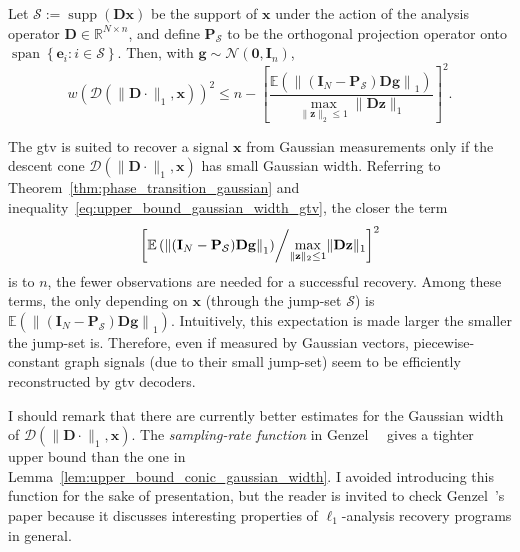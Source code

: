 \begin{lemma}\label{lem:upper_bound_conic_gaussian_width}
    Let $\mathcal{S} := \operatorname{supp}\left ( \mathbf{Dx} \right )$ be the support of $\mathbf{x}$ under the action of the analysis operator $\mathbf{D} \in \mathbb{R}^{N \times n}$, and define $\mathbf{P}_\mathcal{S}$ to be the orthogonal projection operator onto $\operatorname{span}\left \{ \mathbf{e}_i : i \in \mathcal{S} \right \}$. Then, with $\mathbf{g} \sim \mathcal{N}(\mathbf{0}, \mathbf{I}_n)$,
    \begin{equation}
        w(\mathcal{D}(\|\mathbf{D} \cdot \|_1, \mathbf{x}))^2 \leq n - \left [ \frac{\mathbb{E} \left ( \left \|(\mathbf{I}_N - \mathbf{P}_\mathcal{S}) \mathbf{Dg} \right \|_1 \right )}{\underset{\|\mathbf{z}\|_2 \leq 1}{\max} \| \mathbf{Dz} \|_1} \right ]^2.
        \label{eq:upper_bound_gaussian_width_gtv}
    \end{equation}
\end{lemma}

The \acrshort{gtv} is suited to recover a signal $\mathbf{x}$ from Gaussian measurements only if the descent cone $\mathcal{D}(\|\mathbf{D} \cdot \|_1, \mathbf{x})$ has small Gaussian width. Referring to Theorem~\ref{thm:phase_transition_gaussian} and inequality~\eqref{eq:upper_bound_gaussian_width_gtv}, the closer the term $$\left[ \mathbb{E} \left ( \left \|(\mathbf{I}_N - \mathbf{P}_\mathcal{S}) \mathbf{Dg} \right \|_1 \right ) \middle/ \underset{\|\mathbf{z}\|_2 \leq 1}{\max} \| \mathbf{Dz} \|_1 \right ]^2$$ is to $n$, the fewer observations are needed for a successful recovery. Among these terms, the only depending on $\mathbf{x}$ (through the jump-set $\mathcal{S}$) is $\mathbb{E} \left ( \left \|(\mathbf{I}_N - \mathbf{P}_\mathcal{S}) \mathbf{Dg} \right \|_1\right)$. Intuitively, this expectation is made larger the smaller the jump-set is. Therefore, even if measured by Gaussian vectors, piecewise-constant graph signals (due to their small jump-set) seem to be efficiently reconstructed by \acrshort{gtv} decoders.

I should remark that there are currently better estimates for the Gaussian width of $\mathcal{D}(\|\mathbf{D} \cdot \|_1, \mathbf{x})$. The \emph{sampling-rate function} in Genzel~\etal~\cite{genzel2017a} gives a tighter upper bound than the one in Lemma~\ref{lem:upper_bound_conic_gaussian_width}. I avoided introducing this function for the sake of presentation, but the reader is invited to check Genzel~\etal's paper because it discusses interesting properties of $\ell_1$-analysis recovery programs in general.


